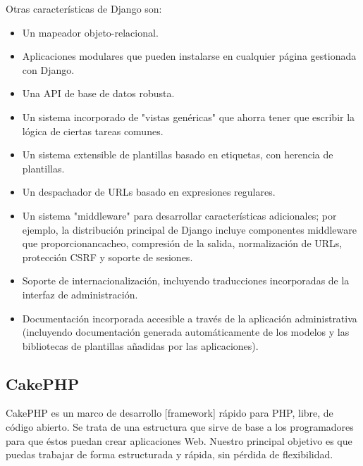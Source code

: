 Otras características de Django son:
\setlength{\parskip}{0mm}
\begin{itemize}

	\item Un mapeador objeto-relacional.
	
	\item Aplicaciones modulares que pueden instalarse en cualquier página gestionada con Django.
	
	\item Una API de base de datos robusta.
	
	\item Un sistema incorporado de "vistas genéricas" que ahorra tener que escribir la lógica de ciertas tareas comunes.
	
	\item Un sistema extensible de plantillas basado en etiquetas, con herencia de plantillas.
	
	\item Un despachador de URLs basado en expresiones regulares.
	
	\item Un sistema "middleware" para desarrollar características adicionales; por ejemplo, la distribución principal de Django incluye componentes middleware que proporcionancacheo, compresión de la salida, normalización de URLs, protección CSRF y soporte de sesiones.
	
	\item Soporte de internacionalización, incluyendo traducciones incorporadas de la interfaz de administración.
	
	\item Documentación incorporada accesible a través de la aplicación administrativa (incluyendo documentación generada automáticamente de los modelos y las bibliotecas de plantillas añadidas por las aplicaciones).

\end{itemize}




\subsection{CakePHP}
\setlength{\parskip}{5mm}
CakePHP es un marco de desarrollo [framework] rápido para PHP, libre, de código abierto. Se trata de una estructura que sirve de base a los programadores para que éstos puedan crear aplicaciones Web. Nuestro principal objetivo es que puedas trabajar de forma estructurada y rápida, sin pérdida de flexibilidad.

